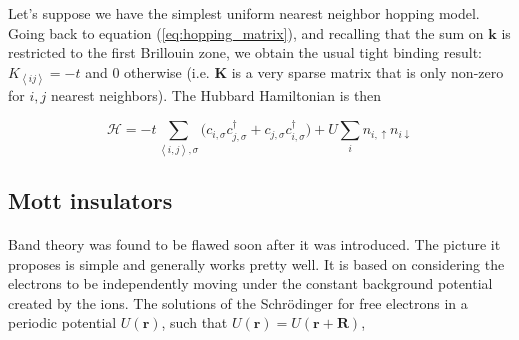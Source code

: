 Let's suppose we have the simplest uniform nearest neighbor hopping model. Going back to equation (\ref{eq:hopping_matrix}), and recalling that the sum on $\bm k$ is restricted to the first Brillouin zone, we obtain the usual tight binding result: $K_{\left\langle i j \right\rangle} = - t$ and $0$ otherwise (i.e. $\bm K$ is a very sparse matrix that is only non-zero for $i, j$ nearest neighbors). The Hubbard Hamiltonian is then

\begin{equation}\label{eq:hubbard_hamiltonian}
\mathcal{H} = - t \sum_{\left\langle i, j \right\rangle, \sigma} \bigg(c_{i,\sigma} c_{j,\sigma}^\dagger + c_{j,\sigma} c_{i,\sigma}^\dagger \bigg) + U \sum_{i} n_{i,\uparrow} n_{i\downarrow}
\end{equation}

\subsection{Mott insulators}\paragraph{}

Band theory was found to be flawed soon after it was introduced. The picture it proposes is simple and generally works pretty well. It is based on considering the electrons to be independently moving under the constant background potential created by the ions. The solutions of the Schr\"odinger for free electrons in a periodic potential $U(\bm r)$, such that $U(\bm r) = U(\bm r + \bm R)$,


